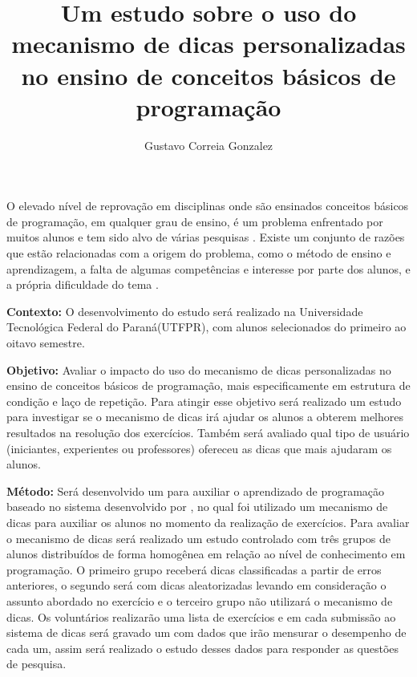 \documentclass[12pt,english,brazil,a4paper,utf8,oneside]{utfpr-tcc}
\author{Gustavo Correia Gonzalez}  %
\title{Um estudo sobre o uso do mecanismo de dicas personalizadas no ensino de conceitos básicos de programação} %
\begin{document}
	
\frontmatter
\maketitle

\begin{resumo}
O elevado nível de reprovação em disciplinas onde são ensinados conceitos básicos de programação, em qualquer grau de ensino, é um problema enfrentado por muitos alunos e tem sido alvo de várias pesquisas \cite{Holcomb:2016:RCA:2839509.2851062}. Existe um conjunto de razões que estão relacionadas com a origem do problema, como o método de ensino e aprendizagem, a falta de algumas competências e interesse por parte dos alunos, e a própria dificuldade do tema \cite{Sinclair:2015:MSE:2729094.2742586}.

\textbf{Contexto:} O desenvolvimento do estudo será realizado na Universidade Tecnológica Federal do Paraná(UTFPR), com alunos selecionados do primeiro ao oitavo semestre.

\textbf{Objetivo:} Avaliar o impacto do uso do mecanismo de dicas personalizadas no ensino de conceitos básicos de programação, mais especificamente em estrutura de condição e laço de repetição. Para atingir esse objetivo será realizado um estudo para investigar se o mecanismo de dicas irá ajudar os alunos a obterem melhores resultados na resolução dos exercícios. Também será avaliado qual tipo de usuário (iniciantes, experientes ou professores) ofereceu as dicas que mais ajudaram os alunos.

\textbf{Método:} Será desenvolvido um  para auxiliar o aprendizado de programação baseado no sistema  desenvolvido por , no qual foi utilizado um mecanismo de dicas para auxiliar os alunos no momento da realização de exercícios. Para avaliar o mecanismo de dicas será realizado um estudo controlado com três grupos de alunos distribuídos de forma homogênea em relação ao nível de conhecimento em programação. O primeiro grupo receberá dicas classificadas a partir de erros anteriores, o segundo será com dicas aleatorizadas levando em consideração o assunto abordado no exercício e o terceiro grupo não utilizará o mecanismo de dicas. Os voluntários realizarão uma lista de exercícios e em cada submissão ao sistema de dicas será gravado um  com dados que irão mensurar o desempenho de cada um, assim será realizado o estudo desses dados para responder as questões de pesquisa.


\end{resumo}
\end{document}
